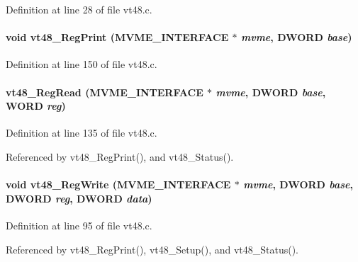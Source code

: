 Definition at line 28 of file vt48.c.
\paragraph[{vt48\_\-RegPrint}]{\setlength{\rightskip}{0pt plus 5cm}void vt48\_\-RegPrint ({\bf MVME\_\-INTERFACE} $\ast$ {\em mvme}, \/  {\bf DWORD} {\em base})}\hfill\label{vt48_8c_a0601108f279d6ef9ebb18ab81057f511}


Definition at line 150 of file vt48.c.
\paragraph[{vt48\_\-RegRead}]{ vt48\_\-RegRead ({\bf MVME\_\-INTERFACE} $\ast$ {\em mvme}, \/  {\bf DWORD} {\em base}, \/  {\bf WORD} {\em reg})}\hfill\label{vt48_8c_a8cc2c9b587fdf95193a9bc0758615524}


Definition at line 135 of file vt48.c.

Referenced by vt48\_\-RegPrint(), and vt48\_\-Status().
\paragraph[{vt48\_\-RegWrite}]{\setlength{\rightskip}{0pt plus 5cm}void vt48\_\-RegWrite ({\bf MVME\_\-INTERFACE} $\ast$ {\em mvme}, \/  {\bf DWORD} {\em base}, \/  {\bf DWORD} {\em reg}, \/  {\bf DWORD} {\em data})}\hfill\label{vt48_8c_aa8014da90c3ae3d4a191aa003d76078a}


Definition at line 95 of file vt48.c.

Referenced by vt48\_\-RegPrint(), vt48\_\-Setup(), and vt48\_\-Status().

